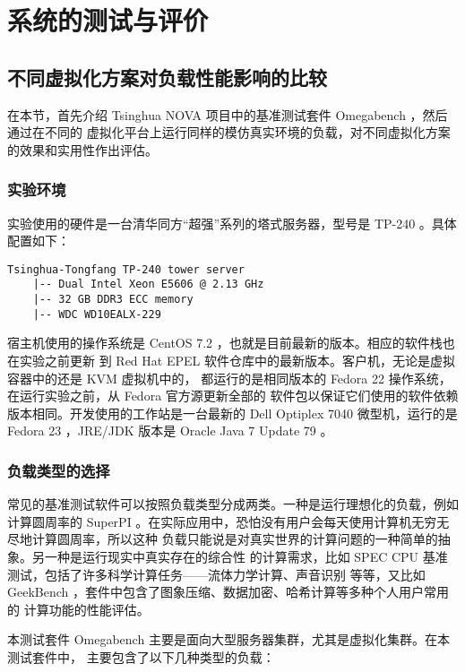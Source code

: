 \chapter{系统的测试与评价}

\section{不同虚拟化方案对负载性能影响的比较}

在本节，首先介绍 Tsinghua NOVA 项目中的基准测试套件 Omegabench ，然后通过在不同的
虚拟化平台上运行同样的模仿真实环境的负载，对不同虚拟化方案的效果和实用性作出评估。

\subsection{实验环境}
\label{subsec:experiment-setup}

实验使用的硬件是一台清华同方“超强”系列的塔式服务器，型号是 TP-240 。具体配置如下：

\begin{lstlisting}
Tsinghua-Tongfang TP-240 tower server
    |-- Dual Intel Xeon E5606 @ 2.13 GHz
    |-- 32 GB DDR3 ECC memory
    |-- WDC WD10EALX-229
\end{lstlisting}

宿主机使用的操作系统是 CentOS 7.2 ，也就是目前最新的版本。相应的软件栈也在实验之前更新
到 Red Hat EPEL 软件仓库中的最新版本。客户机，无论是虚拟容器中的还是 KVM 虚拟机中的，
都运行的是相同版本的 Fedora 22 操作系统，在运行实验之前，从 Fedora 官方源更新全部的
软件包以保证它们使用的软件依赖版本相同。开发使用的工作站是一台最新的 Dell Optiplex 7040
微型机，运行的是 Fedora 23 ，JRE/JDK 版本是 Oracle Java 7 Update 79 。

\subsection{负载类型的选择}

常见的基准测试软件可以按照负载类型分成两类。一种是运行理想化的负载，例如计算圆周率的
SuperPI 。在实际应用中，恐怕没有用户会每天使用计算机无穷无尽地计算圆周率，所以这种
负载只能说是对真实世界的计算问题的一种简单的抽象。另一种是运行现实中真实存在的综合性
的计算需求，比如 SPEC CPU 基准测试，包括了许多科学计算任务——流体力学计算、声音识别
等等，又比如 GeekBench ，套件中包含了图象压缩、数据加密、哈希计算等多种个人用户常用的
计算功能的性能评估。

本测试套件 Omegabench 主要是面向大型服务器集群，尤其是虚拟化集群。在本测试套件中，
主要包含了以下几种类型的负载：

